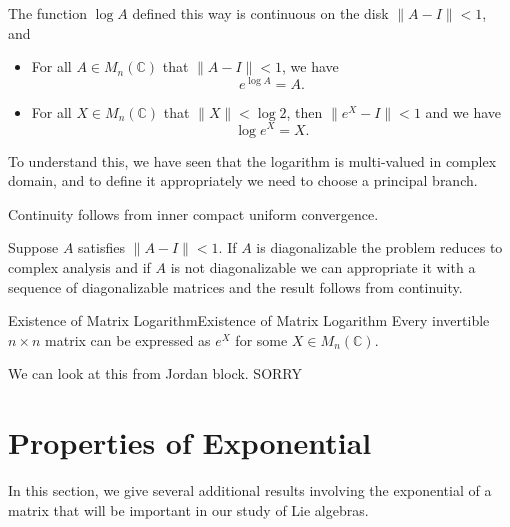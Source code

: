 \documentclass[../main.tex]{subfiles}
\begin{document}
\begin{theorem}{}{}
  The function $\log A$ defined this way is continuous on the disk $\|A - I\| < 1$, and
  \begin{itemize}
    \item For all $A \in M_n(\mathbb{C})$ that $\|A - I\| < 1$, we have
      \begin{equation}
        e^{\log A} = A.
      \end{equation}
    \item For all $X \in M_n(\mathbb{C})$ that $\|X\| < \log 2$, then $\|e^X - I\| < 1$ and we have
      \begin{equation}
        \log e^X = X.
      \end{equation}
  \end{itemize}
\end{theorem}

To understand this, we have seen that the logarithm is multi-valued in complex domain, and to define it appropriately we need to choose a principal branch.

\begin{remark}
  Continuity follows from inner compact uniform convergence.

  Suppose $A$ satisfies $\|A - I\| < 1$. If $A$ is diagonalizable the problem reduces to complex analysis and if $A$ is not diagonalizable we can appropriate it with a sequence of diagonalizable matrices and the result follows from continuity.
\end{remark}

\begin{theorem}{Existence of Matrix Logarithm}{Existence of Matrix Logarithm}
  Every invertible $n \times n$ matrix can be expressed as $e^X$ for some $X \in M_n(\mathbb{C})$.
\end{theorem}

We can look at this from Jordan block. SORRY

\section{Properties of Exponential}
In this section, we give several additional results involving the exponential of a matrix that will be important in our study of Lie algebras.
\end{document}
